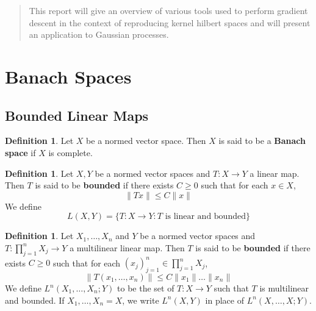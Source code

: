 \documentclass[twoside]{article}
\theoremstyle{definition}
\newtheorem{defn}[definition]{Definition}
\theoremstyle{definition}
\begin{document}
%

%


\begin{abstract}
  This report will give an overview of various tools used to perform gradient descent in the context of reproducing kernel hilbert spaces and will present an application to Gaussian processes. 
\end{abstract}

\section{Banach Spaces}
\subsection{Bounded Linear Maps}
\begin{defn}
		Let $X$ be a normed vector space. Then $X$ is said to be a \textbf{Banach space} if $X$ is complete.  
	\end{defn}
	
	\begin{defn}
		Let $X,Y$ be a normed vector spaces and $T:X \rightarrow Y$ a linear map. Then $T$ is said to be \textbf{bounded} if there exists $C \geq 0$ such that for each $x \in X$, $$\|Tx \|\leq C \|x \|$$ We define $$L(X,Y) = \{T:X \rightarrow Y: T \text{ is linear and bounded}\}$$
	\end{defn}
	
	\begin{defn}
		Let $X_1, \dots, X_n$ and $Y$ be a normed vector spaces and $T:\prod\limits_{j=1}^n X_j \rightarrow Y$ a multilinear linear map. Then $T$ is said to be \textbf{bounded} if there exists $C \geq 0$ such that for each $(x_j)_{j=1}^n \in \prod\limits_{j=1}^n X_j$, $$\|T(x_1, \dots, x_n) \|\leq C \|x_1 \| \dots \|x_n\|$$ 
		We define $L^n(X_1, \dots, X_n; Y)$ to be the set of $T:X \rightarrow Y$ such that $T$ is multilinear and bounded. If $X_1, \dots, X_n = X$, we write $L^n(X,Y)$ in place of  $L^n(X, \dots, X; Y)$.
	\end{defn}
	
\end{document}
